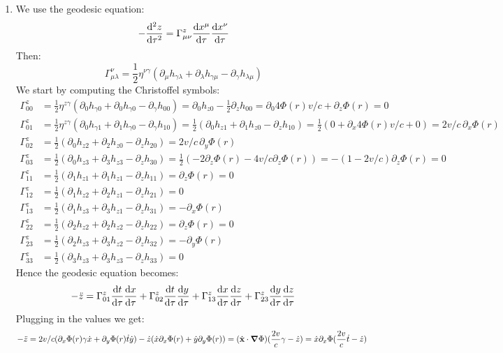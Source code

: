 \documentclass[10pt,a4paper]{article}
\begin{document}
\begin{enumerate}
\begin{enumerate}
\item We use the geodesic equation:
\[
-\dv[2]{z}{\tau} = \Gamma^z_{\mu \nu} \dv{x^\mu}{\tau} \dv{x^\nu}{\tau}
\]
Then:
\[
\Gamma^\nu_{\mu \lambda} = \frac{1}{2}\eta^{\nu \gamma}(\partial_\mu h_{\gamma \lambda} + \partial_{\lambda} h_{\gamma \mu} - \partial_\gamma h_{\lambda \mu})
\]
We start by computing the Christoffel symbols:
\begin{align*}
\Gamma^z_{00} &= \frac{1}{2} \eta^{z \gamma}( \partial_0 h_{\gamma 0} + \partial_0 h_{\gamma 0} - \partial_\gamma h_{00}) = \partial_0 h_{z 0} - \frac{1}{2} \partial_z h_{0 0} = \partial_0 4 \Phi(r) v /c + \partial_z \Phi(r) = 0\\
\Gamma^z_{0 1} &= \frac{1}{2} \eta^{z \gamma} (\partial_0 h_{\gamma 1} + \partial_1 h_{\gamma 0} - \partial_\gamma h_{10}) = \frac{1}{2}(\partial_0 h_{z 1} + \partial_1 h_{z 0} - \partial_z h_{10}) = \frac{1}{2}(0 + \partial_x 4 \Phi(r) v /c + 0) = 2 v /c\,  \partial_x \Phi(r)\\
\Gamma^z_{02} &= \frac{1}{2}(\partial_0 h_{z2} + \partial_2 h_{z0} - \partial_z h_{20}) = 2v/c\, \partial_y \Phi(r)\\
\Gamma^z_{0 3} &= \frac{1}{2}(\partial_0 h_{z3} + \partial_3 h_{z3} - \partial_z h_{30} ) = \frac{1}{2}(-2\partial_z \Phi(r) - 4v/c \partial_z \Phi(r) ) = -(1 - 2v/c) \partial_z \Phi(r) = 0\\
\Gamma^z_{11} &= \frac{1}{2} (\partial_1 h_{z 1} + \partial_1 h_{z 1} - \partial_z h_{11}) =  \partial_z \Phi(r) = 0 \\
\Gamma^z_{12} &= \frac{1}{2}(\partial_1 h_{z 2} + \partial_2 h_{z 1} - \partial_z h_{21}) = 0\\
\Gamma^z_{13} &= \frac{1}{2}( \partial_1 h_{z3} + \partial_3 h_{z1} - \partial_z h_{31} ) = - \partial_x \Phi(r)\\
\Gamma^{z}_{22} &= \frac{1}{2}(\partial_2 h_{z2} + \partial_2 h_{z2} - \partial_z h_{22}) = \partial_z \Phi(r) = 0\\
\Gamma^{z}_{23} &= \frac{1}{2}(\partial_2 h_{z 3} + \partial_3 h_{z2} - \partial_z h_{32}) = - \partial_y \Phi(r)\\
\Gamma^z_{33} &= \frac{1}{2} (\partial_{3} h_{z3} + \partial_3 h_{z3} - \partial_z h_{33}) = 0
\end{align*}
Hence the geodesic equation becomes:
\[
-\ddot{z} = \Gamma^z_{01} \dv{t}{\tau} \dv{x}{\tau} + \Gamma^z_{02} \dv{t}{\tau} \dv{y}{\tau} + \Gamma^z_{13} \dv{x}{\tau}\dv{z}{\tau} + \Gamma^z_{23} \dv{y}{\tau}\dv{z}{\tau}
\]
Plugging in the values we get:
\[
-\ddot{z} = 2v/c( \partial_x \Phi(r) \gamma \dot{x} + \partial_y \Phi(r) \dot{t} \dot{y}) - \dot{z}( \dot{x} \partial_x \Phi(r)  + \dot{y}\partial_y \Phi(r)  )  = (\dot{\vb{x}} \cdot \grad \Phi) (\frac{2v}{c} \gamma - \dot{z}) = \dot{x} \partial_x \Phi (\frac{2v}{c} \dot{t} - \dot{z})
\]
\end{enumerate}
\end{enumerate}
\end{document}
